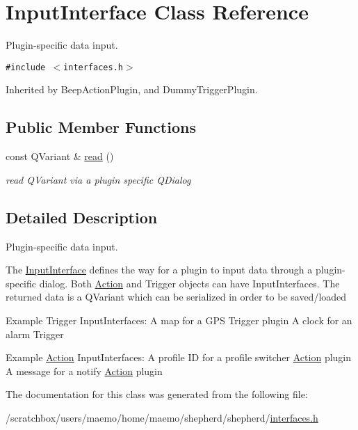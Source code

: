 \hypertarget{class_input_interface}{
\section{InputInterface Class Reference}
\label{class_input_interface}
}
Plugin-specific data input.  


{\tt \#include $<$interfaces.h$>$}

Inherited by BeepActionPlugin, and DummyTriggerPlugin.

\subsection*{Public Member Functions}
\begin{CompactItemize}
\item 
\hypertarget{class_input_interface_360b53fc4f09f786dfb17a721f73bb6d}{
const QVariant \& \hyperlink{class_input_interface_360b53fc4f09f786dfb17a721f73bb6d}{read} ()}
\label{class_input_interface_360b53fc4f09f786dfb17a721f73bb6d}

\begin{CompactList}\small\item\em read QVariant via a plugin specific QDialog \item\end{CompactList}\end{CompactItemize}


\subsection{Detailed Description}
Plugin-specific data input. 

The \hyperlink{class_input_interface}{InputInterface} defines the way for a plugin to input data through a plugin-specific dialog. Both \hyperlink{interface_action}{Action} and Trigger objects can have InputInterfaces. The returned data is a QVariant which can be serialized in order to be saved/loaded

Example Trigger InputInterfaces: A map for a GPS Trigger plugin A clock for an alarm Trigger

Example \hyperlink{interface_action}{Action} InputInterfaces: A profile ID for a profile switcher \hyperlink{interface_action}{Action} plugin A message for a notify \hyperlink{interface_action}{Action} plugin 

The documentation for this class was generated from the following file:\begin{CompactItemize}
\item 
/scratchbox/users/maemo/home/maemo/shepherd/shepherd/\hyperlink{interfaces_8h}{interfaces.h}\end{CompactItemize}
